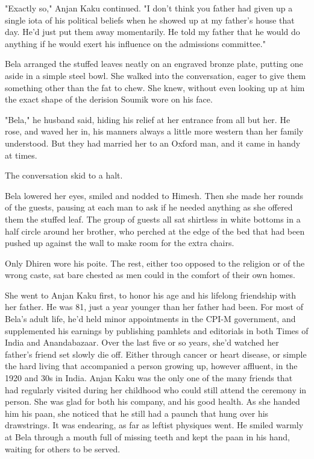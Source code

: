 \documentclass{amsart}
\begin{document}
"Exactly so," Anjan Kaku continued. "I don't think you father had given up a single iota of his political beliefs when he showed up at my father's house that day. He'd just put them away momentarily. He told my father that he would do anything if he would exert his influence on the admissions committee."

Bela arranged the stuffed leaves neatly on an engraved bronze plate, putting one aside in a simple steel bowl. She walked into the conversation, eager to give them something other than the fat to chew. She knew, without even looking up at him the exact shape of the derision Soumik wore on his face.

"Bela," he husband said, hiding his relief at her entrance from all but her. He rose, and waved her in, his manners always a little more western than her family understood. But they had married her to an Oxford man, and it came in handy at times. 

The conversation skid to a halt.

Bela lowered her eyes, smiled and nodded to Himesh. Then she made her rounds of the guests, pausing at each man to ask if he needed anything as she offered them the stuffed leaf. The group of guests all sat shirtless in white bottoms in a half circle around her brother, who perched at the edge of the bed that had been pushed up against the wall to make room for the extra chairs. 

Only Dhiren wore his poite. The rest, either too opposed to the religion or of the wrong caste, sat bare chested as men could in the comfort of their own homes.

She went to Anjan Kaku first, to honor his age and his lifelong friendship with her father. He was 81, just a year younger than her father had been. For most of Bela's adult life, he'd held minor appointments in the CPI-M government, and supplemented his earnings by publishing pamhlets and editorials in both Times of India and Anandabazaar. Over the last five or so years, she'd watched her father's friend set slowly die off. Either through cancer or heart disease, or simple the hard living that accompanied a person growing up, however affluent, in the 1920 and 30s in India. Anjan Kaku was the only one of the many friends that had regularly visited during her childhood who could still attend the ceremony in person. She was glad for both his company, and his good health. As she handed him his paan, she noticed that he still had a paunch that hung over his drawstrings. It was endearing, as far as leftist physiques went. He smiled warmly at Bela through a mouth full of missing teeth and kept the paan in his hand, waiting for others to be served.
\end{document}
